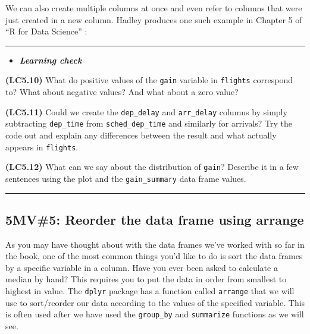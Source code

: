 \documentclass[]{tufte-book}
\newenvironment{Shaded}{\begin{snugshade}}{\end{snugshade}}
\newcommand{\KeywordTok}[1]{\textcolor[rgb]{0.13,0.29,0.53}{\textbf{{#1}}}}
\newcommand{\DataTypeTok}[1]{\textcolor[rgb]{0.13,0.29,0.53}{{#1}}}
\newcommand{\DecValTok}[1]{\textcolor[rgb]{0.00,0.00,0.81}{{#1}}}
\newcommand{\StringTok}[1]{\textcolor[rgb]{0.31,0.60,0.02}{{#1}}}
\newcommand{\NormalTok}[1]{{#1}}
\let\oldrule=\rule
\renewcommand{\rule}[1]{\oldrule{\linewidth}}
\newenvironment{rmdblock}[1]
  {\begin{shaded*}
  \begin{itemize}
  \renewcommand{\labelitemi}{
    \raisebox{-.7\height}[0pt][0pt]{
    }
  }
  \item
  }
  {
  \end{itemize}
  \end{shaded*}
  }
\newenvironment{learncheck}
  {\begin{rmdblock}{warning}}
  {\end{rmdblock}}
\theoremstyle{definition}
\theoremstyle{definition}
\theoremstyle{remark}
\begin{document}
We can also create multiple columns at once and even refer to columns
that were just created in a new column. Hadley produces one such example
in Chapter 5 of ``R for Data Science'' \citep{rds2016}:

\begin{Shaded}
\end{Shaded}

\begin{center}\rule{0.5\linewidth}{\linethickness}\end{center}

\begin{learncheck}
\textbf{\emph{Learning check}}
\end{learncheck}

\textbf{(LC5.10)} What do positive values of the \texttt{gain} variable
in \texttt{flights} correspond to? What about negative values? And what
about a zero value?

\textbf{(LC5.11)} Could we create the \texttt{dep\_delay} and
\texttt{arr\_delay} columns by simply subtracting \texttt{dep\_time}
from \texttt{sched\_dep\_time} and similarly for arrivals? Try the code
out and explain any differences between the result and what actually
appears in \texttt{flights}.

\textbf{(LC5.12)} What can we say about the distribution of
\texttt{gain}? Describe it in a few sentences using the plot and the
\texttt{gain\_summary} data frame values.

\begin{center}\rule{0.5\linewidth}{\linethickness}\end{center}

\subsection{5MV\#5: Reorder the data frame using arrange}\label{arrange}

As you may have thought about with the data frames we've worked with so
far in the book, one of the most common things you'd like to do is sort
the data frames by a specific variable in a column. Have you ever been
asked to calculate a median by hand? This requires you to put the data
in order from smallest to highest in value. The \texttt{dplyr} package
has a function called \texttt{arrange} that we will use to sort/reorder
our data according to the values of the specified variable. This is
often used after we have used the \texttt{group\_by} and
\texttt{summarize} functions as we will see.
\end{document}
